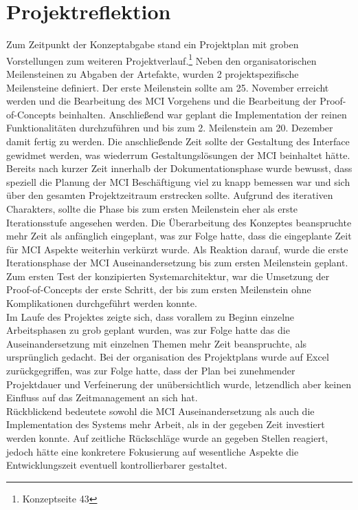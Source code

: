 
\chapter{Projektreflektion}
Zum Zeitpunkt der Konzeptabgabe stand ein Projektplan mit groben Vorstellungen zum weiteren Projektverlauf.\footnote{Konzeptseite 43} Neben den organisatorischen Meilensteinen zu Abgaben der Artefakte, wurden 2 projektspezifische Meilensteine definiert. Der erste Meilenstein sollte am 25. November erreicht werden und die Bearbeitung des MCI Vorgehens und die Bearbeitung der Proof-of-Concepts beinhalten. 
Anschließend war geplant die Implementation der reinen Funktionalitäten durchzuführen und bis zum 2. Meilenstein am 20. Dezember damit fertig zu werden. Die anschließende Zeit sollte der Gestaltung des Interface gewidmet werden, was wiederrum Gestaltungslösungen der MCI beinhaltet hätte. \\
Bereits nach kurzer Zeit innerhalb der Dokumentationsphase wurde bewusst, dass speziell die Planung der MCI Beschäftigung viel zu knapp bemessen war und sich über den gesamten Projektzeitraum erstrecken sollte. Aufgrund des iterativen Charakters, sollte die Phase bis zum ersten Meilenstein eher als erste Iterationsstufe angesehen werden. Die Überarbeitung des Konzeptes beanspruchte mehr Zeit als anfänglich eingeplant, was zur Folge hatte, dass die eingeplante Zeit für MCI Aspekte weiterhin verkürzt wurde. Als Reaktion darauf, wurde die erste Iterationsphase der MCI Auseinandersetzung bis zum ersten Meilenstein geplant. Zum ersten Test der konzipierten Systemarchitektur, war die Umsetzung der Proof-of-Concepts der erste Schritt, der bis zum ersten Meilenstein ohne Komplikationen durchgeführt werden konnte.\\
Im Laufe des Projektes zeigte sich, dass vorallem zu Beginn einzelne Arbeitsphasen zu grob geplant wurden, was zur Folge hatte das die Auseinandersetzung mit einzelnen Themen mehr Zeit beanspruchte, als ursprünglich gedacht. Bei der organisation des Projektplans wurde auf Excel zurückgegriffen, was zur Folge hatte, dass der Plan bei zunehmender Projektdauer und Verfeinerung der unübersichtlich wurde, letzendlich aber keinen Einfluss auf das Zeitmanagement an sich hat.\\

Rückblickend bedeutete sowohl die MCI Auseinandersetzung als auch die Implementation des Systems mehr Arbeit, als in der gegeben Zeit investiert werden konnte. 
Auf zeitliche Rückschläge wurde an gegeben Stellen reagiert, jedoch hätte eine konkretere Fokusierung auf wesentliche Aspekte die Entwicklungszeit eventuell kontrollierbarer gestaltet.\\ 

